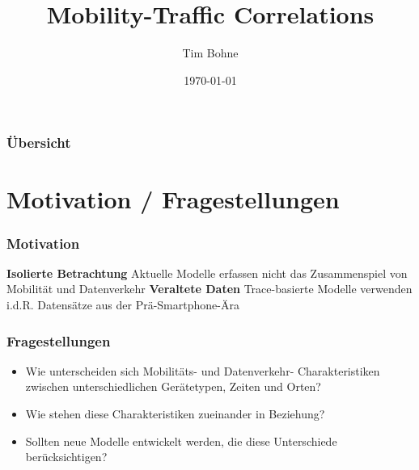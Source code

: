 \documentclass{beamer}
\title[]{Mobility-Traffic Correlations}
\author{Tim Bohne}
\institute[]
{
\textit{Bachelor-Seminar: Mobility and Traffic in Computer Networks}
\medskip
}
\date{\today}
\begin{document}
\begin{frame}[plain] %
\titlepage %
\end{frame}

\begin{frame}
\frametitle{Übersicht} %
\tableofcontents
\end{frame}

\section{Motivation / Fragestellungen}

\begin{frame}
  \frametitle{Motivation}
  \textit{}
  \newline\newline
  \textbf{Isolierte Betrachtung}\newline
  Aktuelle Modelle erfassen nicht das Zusammenspiel von Mobilität und Datenverkehr\newline\newline
  \textbf{Veraltete Daten}\newline
  Trace-basierte Modelle verwenden i.d.R. Datensätze aus der Prä-Smartphone-Ära
\end{frame}

\begin{frame}
  \frametitle{Fragestellungen}
  \begin{itemize}
    \item Wie unterscheiden sich Mobilitäts- und Datenverkehr- Charakteristiken zwischen unterschiedlichen Gerätetypen,
    Zeiten und Orten?\newline
    \item Wie stehen diese Charakteristiken zueinander in Beziehung?\newline
    \item Sollten neue Modelle entwickelt werden, die diese Unterschiede berücksichtigen?
\end{itemize}
\end{frame}
\end{document}
